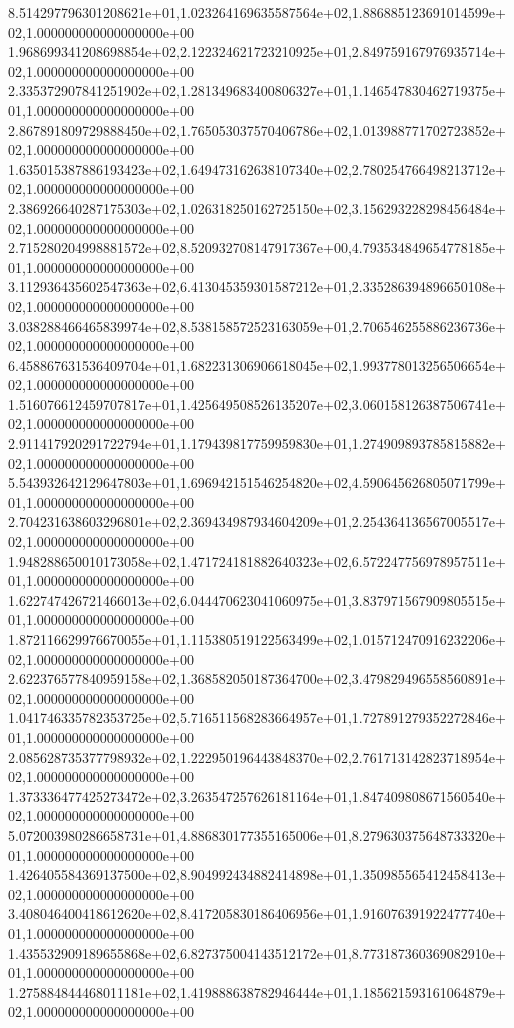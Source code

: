 8.514297796301208621e+01,1.023264169635587564e+02,1.886885123691014599e+02,1.000000000000000000e+00
1.968699341208698854e+02,2.122324621723210925e+01,2.849759167976935714e+02,1.000000000000000000e+00
2.335372907841251902e+02,1.281349683400806327e+01,1.146547830462719375e+01,1.000000000000000000e+00
2.867891809729888450e+02,1.765053037570406786e+02,1.013988771702723852e+02,1.000000000000000000e+00
1.635015387886193423e+02,1.649473162638107340e+02,2.780254766498213712e+02,1.000000000000000000e+00
2.386926640287175303e+02,1.026318250162725150e+02,3.156293228298456484e+02,1.000000000000000000e+00
2.715280204998881572e+02,8.520932708147917367e+00,4.793534849654778185e+01,1.000000000000000000e+00
3.112936435602547363e+02,6.413045359301587212e+01,2.335286394896650108e+02,1.000000000000000000e+00
3.038288466465839974e+02,8.538158572523163059e+01,2.706546255886236736e+02,1.000000000000000000e+00
6.458867631536409704e+01,1.682231306906618045e+02,1.993778013256506654e+02,1.000000000000000000e+00
1.516076612459707817e+01,1.425649508526135207e+02,3.060158126387506741e+02,1.000000000000000000e+00
2.911417920291722794e+01,1.179439817759959830e+01,1.274909893785815882e+02,1.000000000000000000e+00
5.543932642129647803e+01,1.696942151546254820e+02,4.590645626805071799e+01,1.000000000000000000e+00
2.704231638603296801e+02,2.369434987934604209e+01,2.254364136567005517e+02,1.000000000000000000e+00
1.948288650010173058e+02,1.471724181882640323e+02,6.572247756978957511e+01,1.000000000000000000e+00
1.622747426721466013e+02,6.044470623041060975e+01,3.837971567909805515e+01,1.000000000000000000e+00
1.872116629976670055e+01,1.115380519122563499e+02,1.015712470916232206e+02,1.000000000000000000e+00
2.622376577840959158e+02,1.368582050187364700e+02,3.479829496558560891e+02,1.000000000000000000e+00
1.041746335782353725e+02,5.716511568283664957e+01,1.727891279352272846e+01,1.000000000000000000e+00
2.085628735377798932e+02,1.222950196443848370e+02,2.761713142823718954e+02,1.000000000000000000e+00
1.373336477425273472e+02,3.263547257626181164e+01,1.847409808671560540e+02,1.000000000000000000e+00
5.072003980286658731e+01,4.886830177355165006e+01,8.279630375648733320e+01,1.000000000000000000e+00
1.426405584369137500e+02,8.904992434882414898e+01,1.350985565412458413e+02,1.000000000000000000e+00
3.408046400418612620e+02,8.417205830186406956e+01,1.916076391922477740e+01,1.000000000000000000e+00
1.435532909189655868e+02,6.827375004143512172e+01,8.773187360369082910e+01,1.000000000000000000e+00
1.275884844468011181e+02,1.419888638782946444e+01,1.185621593161064879e+02,1.000000000000000000e+00
